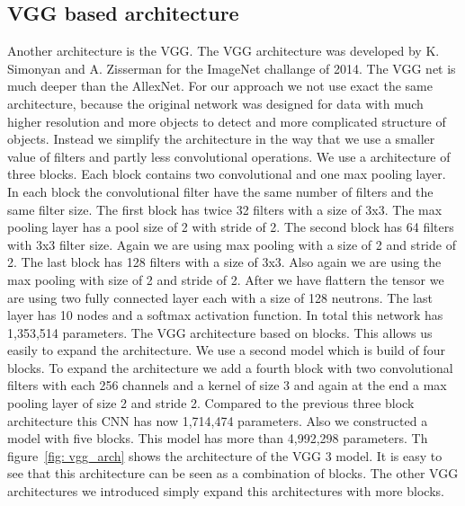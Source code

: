 \documentclass[11pt, a4paper]{article}
\begin{document}
\subsection{VGG based architecture}
Another architecture is the VGG. The VGG architecture was developed by K. Simonyan and A. Zisserman for the ImageNet challange of 2014. The VGG net is much deeper than the AllexNet.
For our approach we not use exact the same architecture, because the original network was designed for data with much higher resolution and more objects to detect and more complicated structure of objects. Instead we simplify the architecture in the way that we use a smaller value of filters and partly less convolutional operations. We use a architecture of three blocks. Each block contains two convolutional and one max pooling layer. In each block the convolutional filter have the same number of filters and the same filter size. The first block has twice 32 filters with a size of 3x3. The max pooling layer has a pool size of 2 with stride of 2. The second block has 64 filters with 3x3 filter size. Again we are using max pooling with a size of 2 and stride of 2. The last block has 128 filters with a size of 3x3. Also again we are using the max pooling with size of 2 and stride of 2. After we have flattern the tensor we are using two fully connected layer each with a size of 128 neutrons. The last layer has 10 nodes and a softmax activation function. In total this network has 1,353,514 parameters. The VGG architecture based on blocks. This allows us easily to expand the architecture. We use a second model which is build of four blocks. To expand the architecture we add a fourth block with two convolutional filters with each 256 channels and a kernel of size 3 and again at the end a max pooling layer of size 2 and stride 2. Compared to the previous three block architecture this CNN has now 1,714,474 parameters. Also we constructed a model with five blocks. This model has more than 4,992,298 parameters. Th figure~\ref{fig: vgg_arch} shows the architecture of the VGG 3 model. It is easy to see that this architecture can be seen as a combination of blocks. The other VGG architectures we introduced simply expand this architectures with more blocks.
\end{document}
